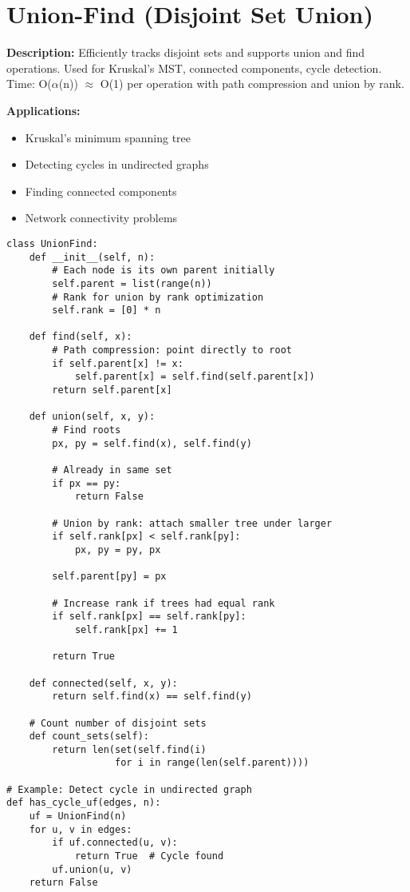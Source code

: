 \section{Union-Find (Disjoint Set Union)}

\textbf{Description:} Efficiently tracks disjoint sets and supports union and find operations. Used for Kruskal's MST, connected components, cycle detection. Time: O($\alpha$(n)) $\approx$ O(1) per operation with path compression and union by rank.

\textbf{Applications:}
\begin{itemize}
\item Kruskal's minimum spanning tree
\item Detecting cycles in undirected graphs
\item Finding connected components
\item Network connectivity problems
\end{itemize}

\begin{lstlisting}
class UnionFind:
    def __init__(self, n):
        # Each node is its own parent initially
        self.parent = list(range(n))
        # Rank for union by rank optimization
        self.rank = [0] * n
    
    def find(self, x):
        # Path compression: point directly to root
        if self.parent[x] != x:
            self.parent[x] = self.find(self.parent[x])
        return self.parent[x]
    
    def union(self, x, y):
        # Find roots
        px, py = self.find(x), self.find(y)
        
        # Already in same set
        if px == py:
            return False
        
        # Union by rank: attach smaller tree under larger
        if self.rank[px] < self.rank[py]:
            px, py = py, px
        
        self.parent[py] = px
        
        # Increase rank if trees had equal rank
        if self.rank[px] == self.rank[py]:
            self.rank[px] += 1
        
        return True
    
    def connected(self, x, y):
        return self.find(x) == self.find(y)
    
    # Count number of disjoint sets
    def count_sets(self):
        return len(set(self.find(i) 
                   for i in range(len(self.parent))))

# Example: Detect cycle in undirected graph
def has_cycle_uf(edges, n):
    uf = UnionFind(n)
    for u, v in edges:
        if uf.connected(u, v):
            return True  # Cycle found
        uf.union(u, v)
    return False
\end{lstlisting}
